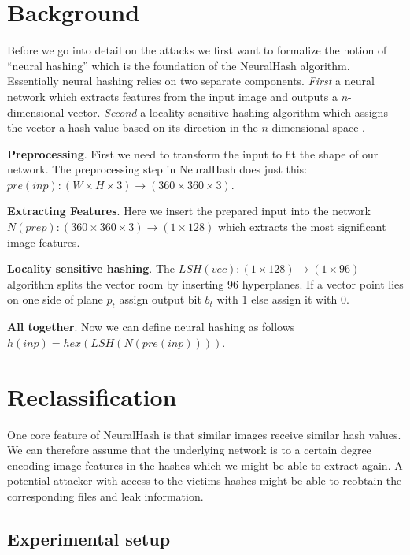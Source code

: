 \documentclass[10pt,twocolumn,letterpaper]{article}
\newcommand{\rref}[1]{\hyperref[ref:#1]{\text{[#1]}}}
\begin{document}
\section{Background}
\label{sec:background}

Before we go into detail on the attacks we first want to formalize the notion of ``neural hashing'' which is the foundation of the NeuralHash algorithm. Essentially neural hashing relies on two separate components. \textit{First} a neural network which extracts features from the input image and outputs a $n$-dimensional vector. \textit{Second} a locality sensitive hashing algorithm which assigns the vector a hash value based on its direction in the $n$-dimensional space \rref{3}.

\textbf{Preprocessing}. First we need to transform the input to fit the shape of our network. The preprocessing step in NeuralHash does just this: $pre(inp): (W \times H \times 3) \rightarrow (360 \times 360 \times 3)$.

\textbf{Extracting Features}. Here we insert the prepared input into the network $N(prep) : (360 \times 360 \times 3) \rightarrow (1 \times 128)$ which extracts the most significant image features.

\textbf{Locality sensitive hashing}. The $LSH(vec) : (1 \times 128) \rightarrow (1 \times 96)$ algorithm splits the vector room by inserting $96$ hyperplanes. If a vector point lies on one side of plane $p_t$ assign output bit $b_t$ with $1$ else assign it with $0$.

\textbf{All together}. Now we can define neural hashing as follows $h(inp) = hex(LSH(N(pre(inp))))$. 

\section{Reclassification}
\label{sec:reclass}

One core feature of NeuralHash is that similar images receive similar hash values. We can therefore assume that the underlying network is to a certain degree encoding image features in the hashes which we might be able to extract again. A potential attacker with access to the victims hashes might be able to reobtain the corresponding files and leak information.

\subsection{Experimental setup}
\end{document}
